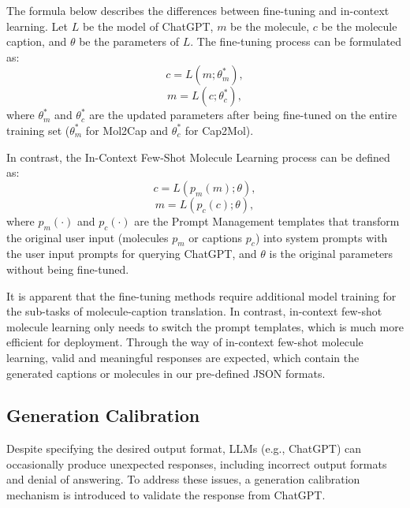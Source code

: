\documentclass{article}
\theoremstyle{plain}
\theoremstyle{definition}
\theoremstyle{remark}
\begin{document}
The formula below describes the differences between fine-tuning and in-context learning. 
Let $L$ be the model of ChatGPT, $m$ be the molecule, $c$ be the molecule caption, and $\theta$ be the parameters of $L$. The fine-tuning process can be formulated as: \begin{equation}
    c = L(m;\theta^*_m), 
\end{equation}
\begin{equation}
    m = L(c;\theta^{*}_c),
\end{equation}
where $\theta^*_m$ and $\theta^{*}_c$ are the updated parameters after being fine-tuned on the entire training set ($\theta^*_m$ for Mol2Cap and $\theta^*_c$ for Cap2Mol).

In contrast, the In-Context Few-Shot Molecule Learning process can be defined as:
\begin{equation}
    c = L(p_m(m);\theta),
\end{equation}
\begin{equation}
    m = L(p_c(c);\theta),
\end{equation}
where $p_m(\cdot)$ and $p_c(\cdot)$ are the Prompt Management templates that transform the original user input (molecules $p_m$ or captions $p_c$) into system prompts with the user input prompts for querying ChatGPT, and $\theta$ is the original parameters without being fine-tuned.

It is apparent that the fine-tuning methods require additional model training for the sub-tasks of molecule-caption translation.
In contrast, in-context few-shot molecule learning only needs to switch the prompt templates, which is much more efficient for deployment. Through the way of in-context few-shot molecule learning, valid and meaningful responses are expected, which contain the generated captions or molecules in our pre-defined JSON formats.


\subsection{Generation Calibration}
Despite specifying the desired output format, LLMs (e.g., ChatGPT) can occasionally produce unexpected responses, including incorrect output formats and denial of answering. 
To address these issues, a generation calibration mechanism is introduced to validate the response from ChatGPT.
\end{document}
